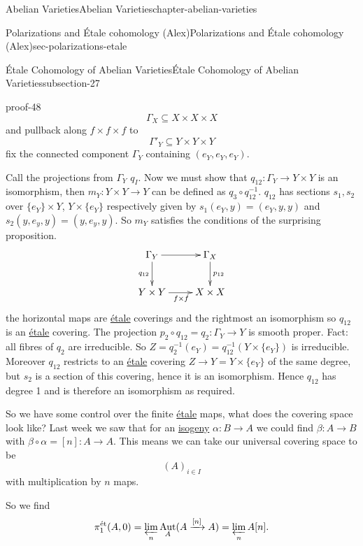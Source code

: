 \documentclass[oneside,10pt,]{book}
\numberwithin{equation}{section}
\newcommand{\lb}{[}
\newcommand{\rb}{]}
\newcommand{\et}{\mathrm{\acute{e}t}}
\DeclareMathOperator{\Aut}{Aut}
\begin{document}
\begin{chapterptx}{Abelian Varieties}{}{Abelian Varieties}{}{}{chapter-abelian-varieties}
\begin{sectionptx}{Polarizations and Étale cohomology (Alex)}{}{Polarizations and Étale cohomology (Alex)}{}{}{sec-polarizations-etale}
\begin{subsectionptx}{Étale Cohomology of Abelian Varieties}{}{Étale Cohomology of Abelian Varieties}{}{}{subsection-27}
\begin{proofptx}{}{proof-48}
\begin{equation*}
\Gamma_X \subseteq X\times X\times X
\end{equation*}
and pullback along \(f\times f\times f\) to%
\begin{equation*}
\Gamma'_Y \subseteq Y\times Y\times Y
\end{equation*}
fix the connected component \(\Gamma_Y\) containing \((e_Y,e_Y,e_Y)\).%
\par
\hypertarget{p-293}{}%
Call the projections from \(\Gamma_Y\) \(q_I\). Now we must show that \(q_{12}\colon \Gamma_Y \to Y\times Y\) is an isomorphism, then \(m_Y\colon Y\times Y \to Y\) can be defined as \(q_3 \circ q_{12}^{-1}\). \(q_{12}\) has sections \(s_1,s_2\) over \(\{e_Y\}\times Y\), \(Y\times \{e_Y\}\) respectively given by \(s_1(e_Y,y) = (e_Y,y,y)\) and \(s_2(y,e_y,y) = (y,e_y,y)\). So \(m_Y\) satisfies the conditions of the surprising proposition.%
\begin{equation*}
\xymatrix{
\Gamma_Y \ar[r]\ar[d]_{q_{12}} & \Gamma_X\ar[d]^{p_{12}} \\
Y\times Y \ar[r]_{f\times f} & X\times X
}
\end{equation*}
the horizontal maps are \hyperref[def-etale]{étale} coverings and the rightmost an isomorphism so \(q_{12}\) is an \hyperref[def-etale]{étale} covering. The projection \(p_2 \circ q_{12} = q_2 \colon \Gamma_Y\to Y\) is smooth proper. Fact: all fibres of \(q_2\) are irreducible. So \(Z = q_2^{-1} (e_Y) = q_{12}^{-1}(Y\times \{e_Y\})\) is irreducible. Moreover \(q_{12}\) restricts to an \hyperref[def-etale]{étale} covering \(Z \to Y = Y\times\{e_Y\}\) of  the same degree, but \(s_2\) is a section of this covering, hence it is an isomorphism. Hence \(q_{12}\) has degree 1 and is therefore an isomorphism as required.%
\end{proofptx}
\hypertarget{p-294}{}%
So we have some control over the finite \hyperref[def-etale]{étale} maps, what does the covering space look like? Last week we saw that for an \hyperref[def-supersing-isog-isog]{isogeny} \(\alpha\colon B \to A\) we could find \(\beta \colon A \to B\) with \(\beta\circ\alpha = \lb n\rb\colon A \to A\). This means we can take our universal covering space to be%
\begin{equation*}
(A)_{i\in I}
\end{equation*}
with multiplication by \(n\) maps.%
\par
\hypertarget{p-295}{}%
So we find%
\begin{equation*}
\pi_1^\et(A,0) =\varprojlim_n \Aut_A(A\xrightarrow{[n]} A)=  \varprojlim_n A[n]\text{.}

\end{equation*}
\end{subsectionptx}
\end{sectionptx}
\end{chapterptx}
\end{document}
